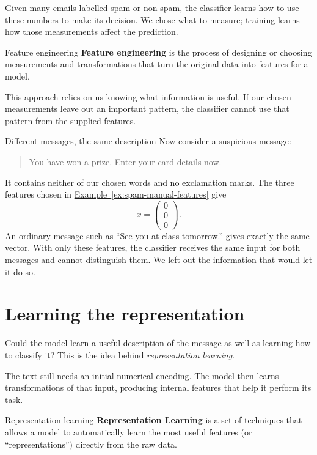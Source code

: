\documentclass[a4paper,12pt,oneside]{report}
\begin{document}
Given many emails labelled spam or non-spam, the classifier learns
how to use these numbers to make its decision. We chose
what to measure; training learns how those measurements affect
the prediction.

\begin{frameddefn}{Feature engineering}\label{def:feature-engineering}
\textbf{Feature engineering} is the process of designing or choosing
measurements and transformations that turn the original data into
features for a model.
\end{frameddefn}

This approach relies on us knowing what information is useful.
If our chosen measurements leave out an important pattern, the
classifier cannot use that pattern from the supplied features.

\begin{framedexample}{Different messages, the same description}
Now consider a suspicious message:
\begin{quote}
You have won a prize. Enter your card details now.
\end{quote}
It contains neither of our chosen words and no exclamation marks.
The three features chosen in
\hyperref[ex:spam-manual-features]{Example~\ref*{ex:spam-manual-features}} give
\[
  x=\begin{pmatrix}0\\0\\0\end{pmatrix}.
\]
An ordinary message such as ``See you at class tomorrow.'' gives
exactly the same vector. With only these features, the classifier
receives the same input for both messages and cannot distinguish
them. We left out the information that would let it do so.
\end{framedexample}

\section{Learning the representation}

Could the model learn a useful description of the message as well
as learning how to classify it? This is the idea behind
\emph{representation learning}.

The text still needs an initial numerical encoding. The model then
learns transformations of that input, producing internal features
that help it perform its task.

\begin{frameddefn}{Representation learning}\label{def:representation-learning}
\textbf{Representation Learning} is a set of techniques that allows a model
to automatically learn the most useful features (or ``representations'')
directly from the raw data.
\end{frameddefn}
\end{document}

